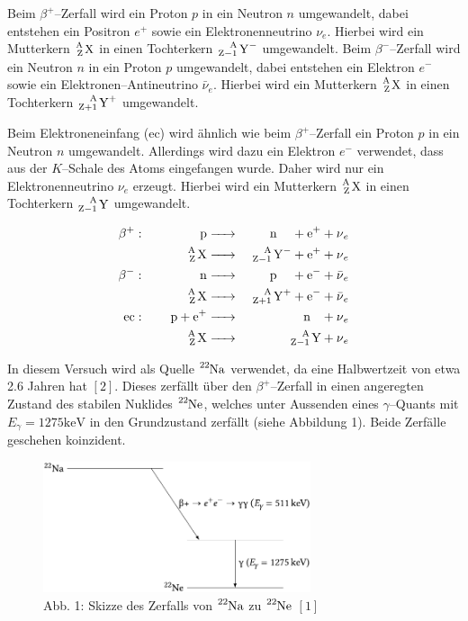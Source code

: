 \documentclass[12pt,a4paper]{scrartcl}
\numberwithin{equation}{section} %
\newcommand{\pu}[1]{\ensuremath{\mathrm{#1}}}
\renewcommand{\[}{} %
\renewcommand{\]}{\noindent} %
\begin{document}
Beim \(\beta^+\)--Zerfall wird ein Proton \(p\) in ein Neutron \(n\)
umgewandelt, dabei entstehen ein Positron \(e^+\) sowie ein
Elektronenneutrino \(\nu_e\). Hierbei wird ein Mutterkern
\(\ce{^A_Z X}\) in einen Tochterkern \(\ce{^A_{Z-1} Y^-}\) umgewandelt.
Beim \(\beta^-\)--Zerfall wird ein Neutron \(n\) in ein Proton \(p\)
umgewandelt, dabei entstehen ein Elektron \(e^-\) sowie ein
Elektronen--Antineutrino \(\bar{\nu}_e\). Hierbei wird ein Mutterkern
\(\ce{^A_Z X}\) in einen Tochterkern \(\ce{^A_{Z+1} Y^+}\) umgewandelt.

Beim Elektroneneinfang (ec) wird ähnlich wie beim \(\beta^+\)--Zerfall
ein Proton \(p\) in ein Neutron \(n\) umgewandelt. Allerdings wird dazu
ein Elektron \(e^-\) verwendet, dass aus der \(K\)--Schale des Atoms
eingefangen wurde. Daher wird nur ein Elektronenneutrino \(\nu_e\)
erzeugt. Hierbei wird ein Mutterkern \(\ce{^A_Z X}\) in einen
Tochterkern \(\ce{^A_{Z-1} Y}\) umgewandelt.

\[
\begin{eqnarray}
    \beta^+:\qquad\,\,\qquad
        \ce{p} &\ce{->}& \quad \ce{n} \quad\, + \ce{e^+} + \ce{\nu_e} \\
        \ce{^A_Z X} &\ce{->}& \ce{^A_{Z-1} Y^-} + \ce{e^+} + \ce{\nu_e} \\
    \beta^-:\qquad\,\,\qquad
        \ce{n} &\ce{->}& \quad \ce{p} \quad\, + \ce{e^-} + \ce{\bar{\nu}_e} \\
        \ce{^A_Z X} &\ce{->}& \ce{^A_{Z+1} Y^+} + \ce{e^-} + \ce{\bar{\nu}_e} \\
    \text{ec}:\qquad
        \ce{p + e^+} &\ce{->}& \quad \ce{n} \ \ \, + \ce{\nu_e} \\
        \ce{^A_Z X} &\ce{->}& \ce{^A_{Z-1} Y} + \ce{\nu_e}
\end{eqnarray}
\]

In diesem Versuch wird als Quelle \(\ce{^{22}Na}\) verwendet, da eine
Halbwertzeit von etwa 2.6 Jahren hat \([2]\). Dieses zerfällt über den
\(\beta^+\)--Zerfall in einen angeregten Zustand des stabilen Nuklides
\(\ce{^{22}Ne}\), welches unter Aussenden eines \(\gamma\)--Quants mit
\(E_\gamma = \pu{1275 keV}\) in den Grundzustand zerfällt (siehe
Abbildung 1). Beide Zerfälle geschehen koinzident.

\begin{figure}
	\centering
	\includegraphics[width=0.7\textwidth]{../media/B3.4/Zerfall_22_Na.pdf}
	\caption{Abb. 1: Skizze des Zerfalls von \(\ce{^{22}Na}\) zu \(\ce{^{22}Ne}\) \([1]\)}
	\label{abb:Skizze 22Na}
\end{figure}
\end{document}
